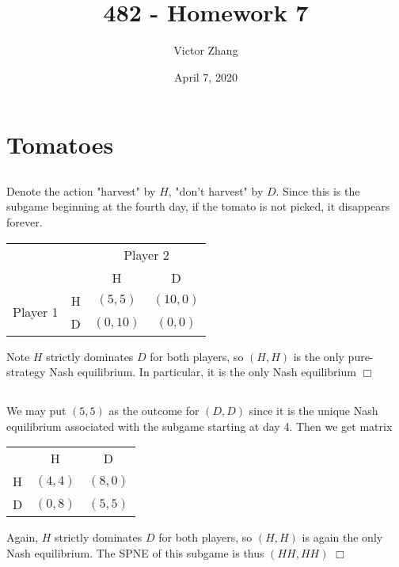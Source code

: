 \documentclass{article}
\title{482 - Homework 7}
\author{Victor Zhang}
\date{April 7, 2020}
\begin{document}
\maketitle

\section{Tomatoes}
\subsection{}
Denote the action "harvest" by $H$, "don't harvest" by $D$. Since this is the subgame beginning at the fourth day, if the tomato is not picked, it disappears forever.
\begin{center}\begin{tabular}{ r c c c }
     & & \multicolumn{2}{c}{Player 2}\\
     & & H & D\\
    \cline{3-4}
    \multirow{2}{*}{Player 1} & H & \multicolumn{1}{|c}{$(5,5)$} & \multicolumn{1}{|c|}{$(10,0)$}\\
    \cline{3-4}
                              & D & \multicolumn{1}{|c}{$(0,10)$} & \multicolumn{1}{|c|}{$(0,0)$}\\
    \cline{3-4}
\end{tabular}\end{center}
Note $H$ strictly dominates $D$ for both players, so $(H,H)$ is the only pure-strategy Nash equilibrium. In particular, it is the only Nash equilibrium $\Box$

\subsection{}
We may put $(5,5)$ as the outcome for $(D,D)$ since it is the unique Nash equilibrium associated with the subgame starting at day 4. Then we get matrix
\begin{center}\begin{tabular}{ c c c }
     & H & D\\
    \cline{2-3}
    H & \multicolumn{1}{|c}{$(4,4)$} & \multicolumn{1}{|c|}{$(8,0)$}\\
    \cline{2-3}
    D & \multicolumn{1}{|c}{$(0,8)$} & \multicolumn{1}{|c|}{$(5,5)$}\\
    \cline{2-3}
\end{tabular}\end{center}
Again, $H$ strictly dominates $D$ for both players, so $(H,H)$ is again the only Nash equilibrium. The SPNE of this subgame is thus $(HH,HH)$ $\Box$
\end{document}
